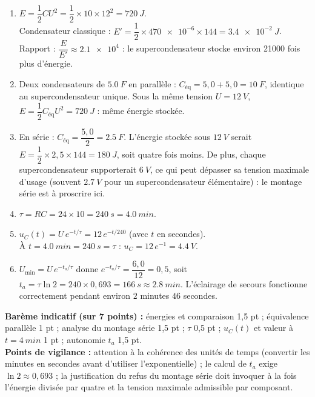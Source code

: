 \documentclass[11pt]{article}
\begin{document}
\begin{corrige}
\begin{enumerate}
\item $E = \dfrac{1}{2}CU^2 = \dfrac{1}{2}\times 10\times 12^2 = \SI{720}{J}$.\\
Condensateur classique : $E' = \dfrac{1}{2}\times \num{470e-6}\times 144 = \SI{3,4e-2}{J}$.\\
Rapport : $\dfrac{E}{E'} \approx \num{2,1e4}$ : le supercondensateur stocke environ \num{21000} fois plus d'énergie.
\item Deux condensateurs de $\SI{5,0}{F}$ en parallèle : $C_{\text{éq}} = 5,0 + 5,0 = \SI{10}{F}$, identique au supercondensateur unique. Sous la même tension $U = \SI{12}{V}$, $E = \dfrac{1}{2}C_{\text{éq}}U^2 = \SI{720}{J}$ : même énergie stockée.
\item En série : $C_{\text{éq}} = \dfrac{5,0}{2} = \SI{2,5}{F}$. L'énergie stockée sous $\SI{12}{V}$ serait $E = \dfrac{1}{2}\times 2,5\times 144 = \SI{180}{J}$, soit quatre fois moins. De plus, chaque supercondensateur supporterait $\SI{6}{V}$, ce qui peut dépasser sa tension maximale d'usage (souvent $\SI{2,7}{V}$ pour un supercondensateur élémentaire) : le montage série est à proscrire ici.
\item $\tau = RC = 24\times 10 = \SI{240}{s} = \SI{4,0}{min}$.
\item $u_C(t) = U\,e^{-t/\tau} = 12\,e^{-t/240}$ (avec $t$ en secondes).\\
À $t = \SI{4,0}{min} = \SI{240}{s} = \tau$ : $u_C = 12\,e^{-1} = \SI{4,4}{V}$.
\item $U_{\min} = U\,e^{-t_a/\tau}$ donne $e^{-t_a/\tau} = \dfrac{6,0}{12} = 0,5$, soit $t_a = \tau\ln 2 = 240\times 0,693 = \SI{166}{s} \approx \SI{2,8}{min}$. L'éclairage de secours fonctionne correctement pendant environ $2$ minutes $46$ secondes.
\end{enumerate}
\textbf{Barème indicatif (sur 7 points) :} énergies et comparaison 1,5 pt ; équivalence parallèle 1 pt ; analyse du montage série 1,5 pt ; $\tau$ 0,5 pt ; $u_C(t)$ et valeur à $t = \SI{4}{min}$ 1 pt ; autonomie $t_a$ 1,5 pt.\\
\textbf{Points de vigilance :} attention à la cohérence des unités de temps (convertir les minutes en secondes avant d'utiliser l'exponentielle) ; le calcul de $t_a$ exige $\ln 2 \approx 0,693$ ; la justification du refus du montage série doit invoquer à la fois l'énergie divisée par quatre et la tension maximale admissible par composant.
\end{corrige}
\end{document}
